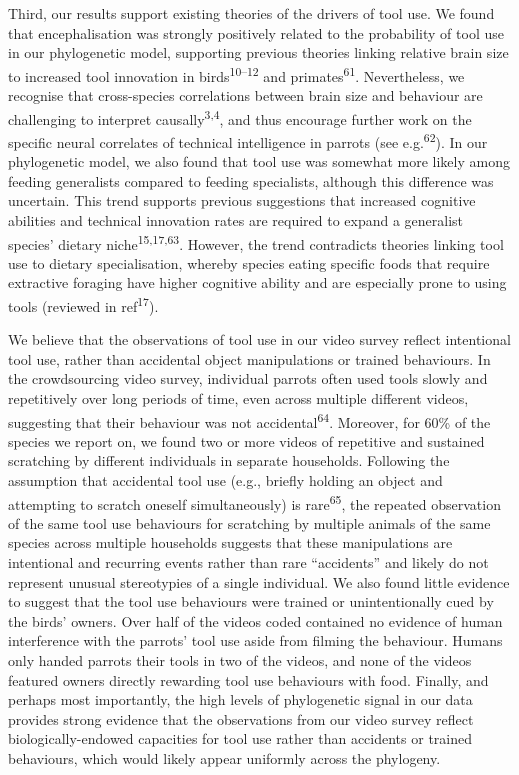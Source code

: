 \documentclass[
  man,floatsintext]{apa6}
\begin{document}
Third, our results support existing theories of the drivers of tool use. We found that encephalisation was strongly positively related to the probability of tool use in our phylogenetic model, supporting previous theories linking relative brain size to increased tool innovation in birds\textsuperscript{10--12} and primates\textsuperscript{61}. Nevertheless, we recognise that cross-species correlations between brain size and behaviour are challenging to interpret causally\textsuperscript{3,4}, and thus encourage further work on the specific neural correlates of technical intelligence in parrots (see e.g.\textsuperscript{62}). In our phylogenetic model, we also found that tool use was somewhat more likely among feeding generalists compared to feeding specialists, although this difference was uncertain. This trend supports previous suggestions that increased cognitive abilities and technical innovation rates are required to expand a generalist species' dietary niche\textsuperscript{15,17,63}. However, the trend contradicts theories linking tool use to dietary specialisation, whereby species eating specific foods that require extractive foraging have higher cognitive ability and are especially prone to using tools (reviewed in ref\textsuperscript{17}).

We believe that the observations of tool use in our video survey reflect intentional tool use, rather than accidental object manipulations or trained behaviours. In the crowdsourcing video survey, individual parrots often used tools slowly and repetitively over long periods of time, even across multiple different videos, suggesting that their behaviour was not accidental\textsuperscript{64}. Moreover, for 60\% of the species we report on, we found two or more videos of repetitive and sustained scratching by different individuals in separate households. Following the assumption that accidental tool use (e.g., briefly holding an object and attempting to scratch oneself simultaneously) is rare\textsuperscript{65}, the repeated observation of the same tool use behaviours for scratching by multiple animals of the same species across multiple households suggests that these manipulations are intentional and recurring events rather than rare ``accidents'' and likely do not represent unusual stereotypies of a single individual. We also found little evidence to suggest that the tool use behaviours were trained or unintentionally cued by the birds' owners. Over half of the videos coded contained no evidence of human interference with the parrots' tool use aside from filming the behaviour. Humans only handed parrots their tools in two of the videos, and none of the videos featured owners directly rewarding tool use behaviours with food. Finally, and perhaps most importantly, the high levels of phylogenetic signal in our data provides strong evidence that the observations from our video survey reflect biologically-endowed capacities for tool use rather than accidents or trained behaviours, which would likely appear uniformly across the phylogeny.
\end{document}
